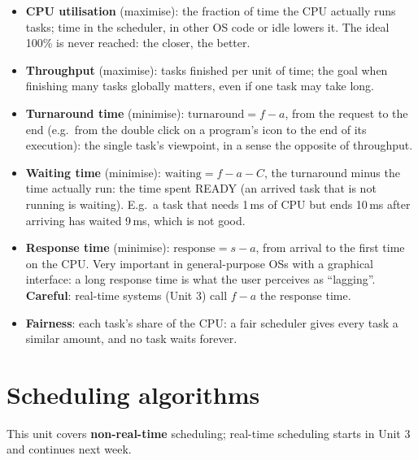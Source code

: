 \begin{itemize}
    \item \textbf{CPU utilisation} (maximise): the fraction of time the CPU actually runs tasks; time in the scheduler, in other OS code or idle lowers it. The ideal 100\% is never reached: the closer, the better.
    \item \textbf{Throughput} (maximise): tasks finished per unit of time; the goal when finishing many tasks globally matters, even if one task may take long.
    \item \textbf{Turnaround time} (minimise): $\text{turnaround} = f - a$, from the request to the end (e.g.\ from the double click on a program's icon to the end of its execution): the single task's viewpoint, in a sense the opposite of throughput.
    \item \textbf{Waiting time} (minimise): $\text{waiting} = f - a - C$, the turnaround minus the time actually run: the time spent READY (an arrived task that is not running is waiting). E.g.\ a task that needs 1\,ms of CPU but ends 10\,ms after arriving has waited 9\,ms, which is not good.
    \item \textbf{Response time} (minimise): $\text{response} = s - a$, from arrival to the first time on the CPU. Very important in general-purpose OSs with a graphical interface: a long response time is what the user perceives as ``lagging''. \textbf{Careful}: real-time systems (Unit 3) call $f - a$ the response time.
    \item \textbf{Fairness}: each task's share of the CPU: a fair scheduler gives every task a similar amount, and no task waits forever.
\end{itemize}

\section{Scheduling algorithms}
This unit covers \textbf{non-real-time} scheduling; real-time scheduling starts in Unit 3 and continues next week.

